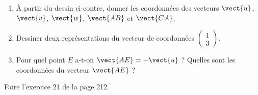 
\begin{exercice}\label{exosmath-0103}

    \begin{center}
   
    \end{center}

        \begin{enumerate}
            \item
                À partir du dessin ci-contre, donner les coordonnées des vecteurs \( \vect{ u }\), \( \vect{ v }\), \( \vect{ w }\), \( \vect{ AB }\) et \( \vect{ CA }\).
            \item
                Dessiner deux représentations du vecteur de coordonnées \( \begin{pmatrix}
                    1    \\ 
                    3    
                \end{pmatrix}\).

            \item
                Pour quel point \( E\) a-t-on \( \vect{ AE }=-\vect{ u }\) ? Quelles sont les coordonnées du vecteur \( \vect{ AE }\) ?
             
        \end{enumerate}

    Faire l'exercice 21 de la page 212.

\end{exercice}
